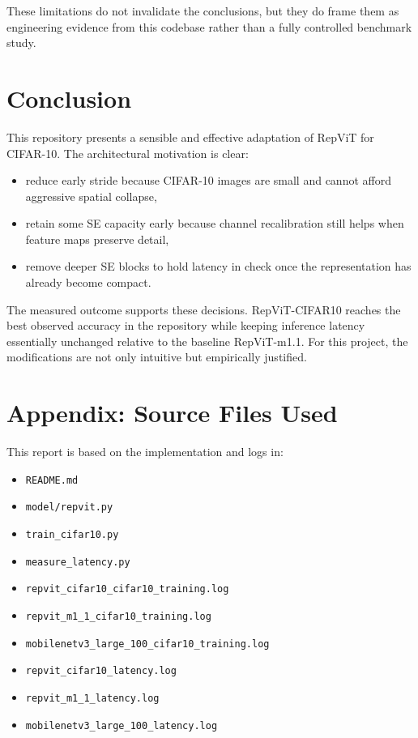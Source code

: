 \documentclass[11pt,a4paper]{article}
\begin{document}
These limitations do not invalidate the conclusions, but they do frame them as engineering evidence from this codebase rather than a fully controlled benchmark study.

\section{Conclusion}

This repository presents a sensible and effective adaptation of RepViT for CIFAR-10. The architectural motivation is clear:
\begin{itemize}[leftmargin=1.5em]
    \item reduce early stride because CIFAR-10 images are small and cannot afford aggressive spatial collapse,
    \item retain some SE capacity early because channel recalibration still helps when feature maps preserve detail,
    \item remove deeper SE blocks to hold latency in check once the representation has already become compact.
\end{itemize}

The measured outcome supports these decisions. RepViT-CIFAR10 reaches the best observed accuracy in the repository while keeping inference latency essentially unchanged relative to the baseline RepViT-m1.1. For this project, the modifications are not only intuitive but empirically justified.

\section*{Appendix: Source Files Used}

This report is based on the implementation and logs in:
\begin{itemize}[leftmargin=1.5em]
    \item \texttt{README.md}
    \item \texttt{model/repvit.py}
    \item \texttt{train\_cifar10.py}
    \item \texttt{measure\_latency.py}
    \item \texttt{repvit\_cifar10\_cifar10\_training.log}
    \item \texttt{repvit\_m1\_1\_cifar10\_training.log}
    \item \texttt{mobilenetv3\_large\_100\_cifar10\_training.log}
    \item \texttt{repvit\_cifar10\_latency.log}
    \item \texttt{repvit\_m1\_1\_latency.log}
    \item \texttt{mobilenetv3\_large\_100\_latency.log}
\end{itemize}
\end{document}
